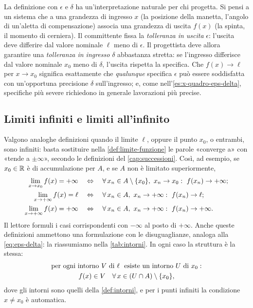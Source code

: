 \begin{idea}
La definizione con $\epsilon$ e $\delta$ ha un'interpretazione naturale per chi progetta.
Si pensi a un sistema che a una grandezza di ingresso $x$ (la posizione della manetta,
l'angolo di un'aletta di compensazione) associa una grandezza di uscita $f(x)$ (la
spinta, il momento di cerniera). Il committente fissa la \emph{tolleranza in uscita}
$\epsilon$: l'uscita deve differire dal valore nominale $\ell$ meno di $\epsilon$.
Il progettista deve allora garantire una \emph{tolleranza in ingresso} $\delta$
abbastanza stretta: se l'ingresso differisce dal valore nominale $x_{0}$ meno di
$\delta$, l'uscita rispetta la specifica. Che $f(x)\to\ell$ per $x\to x_{0}$ significa
esattamente che \emph{qualunque} specifica $\epsilon$ può essere soddisfatta con un'opportuna
precisione $\delta$ sull'ingresso; e, come nell'\cref{es:x-quadro-eps-delta},
specifiche più severe richiedono in generale lavorazioni più precise.
\end{idea}

\subsection{Limiti infiniti e limiti all'infinito}

Valgono analoghe definizioni quando il limite $\ell$, oppure il punto $x_{0}$, o entrambi,
sono infiniti: basta sostituire nella \cref{def:limite-funzione} le parole «converge a»
con «tende a $\pm\infty$», secondo le definizioni del \cref{cap:successioni}. Così, ad
esempio, se $x_{0}\in\mathbb{R}$ è di accumulazione per $A$, e se $A$ non è limitato
superiormente,
\begin{align}
  \lim_{x\to x_{0}}f(x)=+\infty \quad&\sse\quad \perogni x_{n}\in A\setminus\{x_{0}\},\ x_{n}\to x_{0}:\ f(x_{n})\to+\infty;
  \label{eq:def-lim-piu-inf}\\
  \lim_{x\to+\infty}f(x)=\ell \quad&\sse\quad \perogni x_{n}\in A,\ x_{n}\to+\infty:\ f(x_{n})\to\ell;
  \label{eq:def-lim-all-inf}\\
  \lim_{x\to+\infty}f(x)=+\infty \quad&\sse\quad \perogni x_{n}\in A,\ x_{n}\to+\infty:\ f(x_{n})\to+\infty .
  \label{eq:def-lim-inf-inf}
\end{align}
Il lettore formuli i casi corrispondenti con $-\infty$ al posto di $+\infty$. Anche
queste definizioni ammettono una formulazione con le disuguaglianze, analoga alla
\eqref{eq:eps-delta}: la riassumiamo nella \cref{tab:intorni}. In ogni caso la struttura
è la stessa:
\begin{equation}\label{eq:def-intorni}
\begin{gathered}
  \text{per ogni intorno } V \text{ di } \ell \ \ \text{esiste un intorno } U \text{ di } x_{0} :\\
  f(x)\in V \quad\forall\, x\in(U\cap A)\setminus\{x_{0}\},
\end{gathered}
\end{equation}
dove gli intorni sono quelli della \cref{def:intorni}, e per i punti infiniti la
condizione $x\neq x_{0}$ è automatica.

